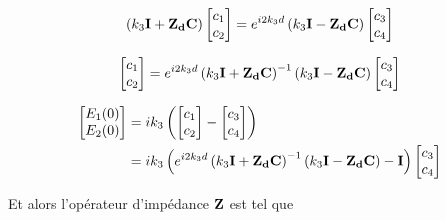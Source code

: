 \begin{equation}
    \left(k_3\mathbf{I} + \mathbf{Z_d}\mathbf{C}\right)
    \begin{bmatrix}
        c_1 \\
        c_2
    \end{bmatrix}
    = e^{i2k_3 d} \left(k_3\mathbf{I} - \mathbf{Z_d}\mathbf{C}\right)
    \begin{bmatrix}
        c_3 \\
        c_4
    \end{bmatrix}
\end{equation}


\begin{equation}
    \begin{bmatrix}
        c_1 \\
        c_2
    \end{bmatrix}
    = e^{i2 k_3 d} \left(k_3\mathbf{I} + \mathbf{Z_d}\mathbf{C}\right)^{-1}\left(k_3\mathbf{I} - \mathbf{Z_d}\mathbf{C}\right)
    \begin{bmatrix}
        c_3 \\
        c_4
    \end{bmatrix}
\end{equation}

\begin{align}
    \begin{bmatrix}
        E_1(0)\\
        E_2(0)\\
    \end{bmatrix}
    &=ik_3\left(
    \begin{bmatrix}
        c_1 \\
        c_2
    \end{bmatrix}
    -
    \begin{bmatrix}
        c_3 \\
        c_4
    \end{bmatrix}
    \right)\\
    &=ik_3\left(e^{i2 k_3 d} \left(k_3\mathbf{I} + \mathbf{Z_d}\mathbf{C}\right)^{-1}\left(k_3\mathbf{I} - \mathbf{Z_d}\mathbf{C}\right) - \mathbf{I} \right)
    \begin{bmatrix}
        c_3 \\
        c_4
    \end{bmatrix}
\end{align}

Et alors l'opérateur d'impédance $\mathbf{Z}$ est tel que

